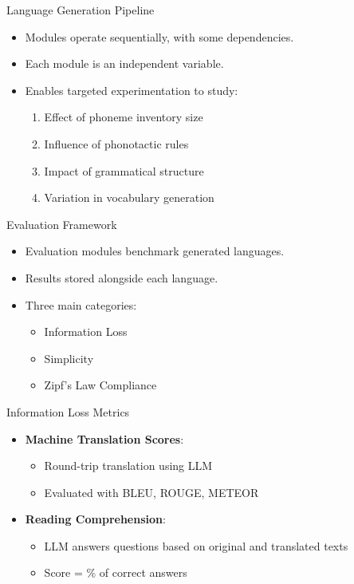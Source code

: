 \documentclass{beamer}
\begin{document}
\begin{frame}{Language Generation Pipeline}
	\begin{itemize}
		\item Modules operate sequentially, with some dependencies.
		\item Each module is an independent variable.
		\item Enables targeted experimentation to study:
		\begin{enumerate}
			\item Effect of phoneme inventory size
			\item Influence of phonotactic rules
			\item Impact of grammatical structure
			\item Variation in vocabulary generation
		\end{enumerate}
	\end{itemize}
\end{frame}

\begin{frame}{Evaluation Framework}
	\begin{itemize}
		\item Evaluation modules benchmark generated languages.
		\item Results stored alongside each language.
		\item Three main categories:
		\begin{itemize}
			\item Information Loss
			\item Simplicity
			\item Zipf's Law Compliance
		\end{itemize}
	\end{itemize}
\end{frame}

\begin{frame}{Information Loss Metrics}
	\begin{itemize}
		\item \textbf{Machine Translation Scores}:
		\begin{itemize}
			\item Round-trip translation using LLM
			\item Evaluated with BLEU, ROUGE, METEOR
		\end{itemize}
		\item \textbf{Reading Comprehension}:
		\begin{itemize}
			\item LLM answers questions based on original and translated texts
			\item Score = \% of correct answers
		\end{itemize}
	\end{itemize}
\end{frame}
\end{document}
